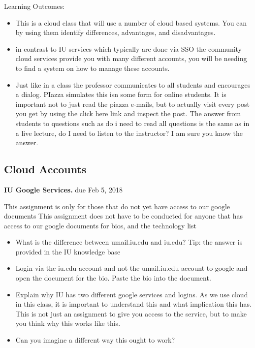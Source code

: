 Learning Outcomes:
\begin{itemize}
\item This is a cloud class that will use a number of cloud based
  systems. You can by using them identify differences, advantages, and
  disadvantages.
\item in contrast to IU services which typically are done via SSO the
  community cloud services provide you with many different accounts,
  you will be needing to find a system on how to manage these
  accounts.
\item Just like in a class the professor communicates to all students
  and encourages a dialog. PIazza simulates this isn some form for
  online students. It is important not to just read the piazza
  e-mails, but to actually visit every post you get by using the click
  here link and inspect the post. The answer from students to
  questions such as do i need to read all questions is the same as in
  a live lecture, do I need to listen to the instructor? I am sure you
  know the answer.
\end{itemize}


\subsection{Cloud Accounts}
\label{E:e222-iu-google-services}

\begin{exercise}\label{E:e222-iu-google}

  {\bf IU Google Services.} due Feb 5, 2018
  
  This assignment is only for those that do
  not yet have access to our google documents This assignment does not
  have to be conducted for anyone that has access to our google
  documents for bios, and the technology list

  \begin{itemize}
 
  \item What is the difference between umail.iu.edu and iu.edu? Tip:
    the answer is provided in the IU knowledge base

  \item Login via the iu.edu account and not the umail.iu.edu account
    to google and open the document for the bio. Paste the bio into
    the document.

  \item Explain why IU has two different google services and
    logins. As we use cloud in this class, it is important to
    understand this and what implication this has. This is not just an
    assignment to give you access to the service, but to make you
    think why this works like this.

  \item Can you imagine a different way this ought to work?

  \end{itemize}

\end{exercise}

